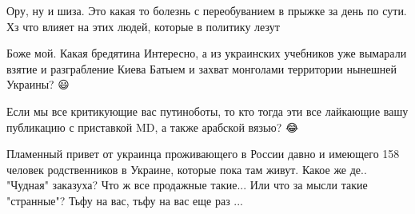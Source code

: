 \begin{itemize}
\begin{itemize}
\end{itemize}

\par
 
Ору, ну и шиза. Это какая то болезнь с переобуванием в прыжке за день по сути.
Хз что влияет на этих людей, которые в политику лезут

%
%

Боже мой. Какая бредятина \Smiley[1.0][yellow] Интересно, а из украинских учебников уже вымарали
взятие и разграбление Киева Батыем и захват монголами территории нынешней
Украины? 😃


 
Если мы все критикующие вас путиноботы, то кто тогда эти все лайкающие вашу
публикацию с приставкой MD, а также арабской вязью? 😂


 

Пламенный привет от украинца проживающего в России давно и имеющего 158 человек
родственников в Украине, которые пока там живут. Какое же де.. "Чудная"
заказуха? Что ж все продажные такие... Или что за мысли такие "странные"? Тьфу
на вас, тьфу на вас еще раз ...


\end{itemize}

